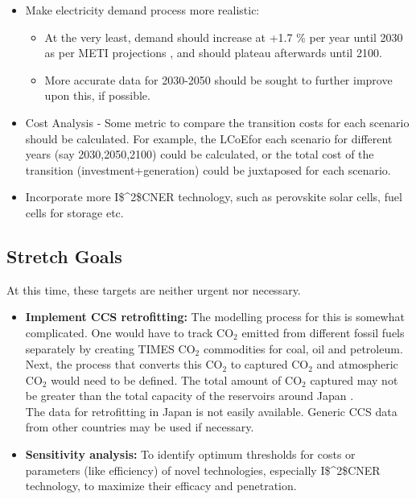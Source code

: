 \documentclass[14pt,a4paper]{article} %
\begin{document}
\begin{itemize}

\item Make electricity demand process more realistic:

\begin{itemize}
\item At the very least, demand should increase at +1.7 \% per year until 2030 as per \gls{METI} projections \cite{noauthor_electricity_2017}, and should plateau afterwards until 2100.

\item More accurate data for 2030-2050 should be sought to further improve upon this, if possible.

\end{itemize}

\item Cost Analysis - Some metric to compare the transition costs for each scenario should be calculated. For example, the \gls{LCoE}for each scenario for different years (say 2030,2050,2100) could be calculated, or the total cost of the transition (investment+generation) could be juxtaposed for each scenario.

\item Incorporate more \gls{I$^2$CNER} technology, such as perovskite solar cells, fuel cells for storage etc.


\end{itemize}

\subsection{Stretch Goals}
At this time, these targets are neither urgent nor necessary.

\begin{itemize}

\item \textbf{Implement \gls{CCS} retrofitting:} The modelling process for this is somewhat complicated. One would have to track CO$_2$ emitted from different fossil fuels separately by creating \gls{TIMES}  CO$_2$ commodities for coal, oil and petroleum. Next, the process that converts this CO$_2$ to captured CO$_2$ and atmospheric CO$_2$ would need to be defined. The total amount of CO$_2$ captured may not be greater than the total capacity of the reservoirs around Japan \cite{kato_energy_2016}.\\
The data for retrofitting in Japan is not easily available. Generic \gls{CCS} data from other countries may be used if necessary.\\

\item \textbf{Sensitivity analysis:} To identify optimum thresholds for costs or parameters (like efficiency) of novel technologies, especially \gls{I$^2$CNER} technology, to maximize their efficacy and penetration.

\end{itemize}



%


%

\end{document}
